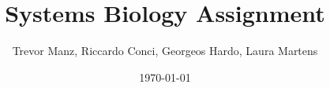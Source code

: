 \documentclass[letterpaper,11pt]{article}
\begin{document}
\title{Systems Biology Assignment}
\author{Trevor Manz, Riccardo Conci, Georgeos Hardo, Laura Martens}
\date{\today}
\maketitle







\end{document}
